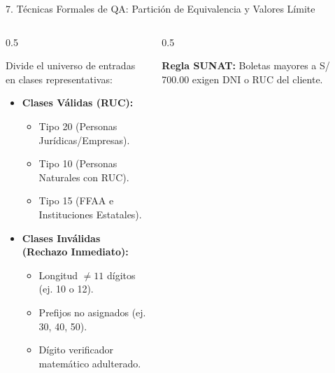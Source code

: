 \documentclass[aspectratio=169,10pt]{beamer}
\begin{document}
\begin{frame}{7. Técnicas Formales de QA: Partición de Equivalencia y Valores Límite}
\begin{columns}
\begin{column}{0.5\textwidth}
    \begin{tcolorbox}[colback=cardbg, colframe=cardbg, title=\color{accentblue}\bfseries 1. Partición de Equivalencia (EP)]
        Divide el universo de entradas en clases representativas:
        \begin{itemize}
            \item \textbf{Clases Válidas (RUC):}
            \begin{itemize}
                \item Tipo 20 (Personas Jurídicas/Empresas).
                \item Tipo 10 (Personas Naturales con RUC).
                \item Tipo 15 (FFAA e Instituciones Estatales).
            \end{itemize}
            \item \textbf{Clases Inválidas (Rechazo Inmediato):}
            \begin{itemize}
                \item Longitud $\neq 11$ dígitos (ej. 10 o 12).
                \item Prefijos no asignados (ej. 30, 40, 50).
                \item Dígito verificador matemático adulterado.
            \end{itemize}
        \end{itemize}
    \end{tcolorbox}
\end{column}
\begin{column}{0.5\textwidth}
    \begin{tcolorbox}[colback=cardbg, colframe=cardbg, title=\color{accentgreen}\bfseries 2. Análisis de Valores Límite (BVA)]
        \textbf{Regla SUNAT:} Boletas mayores a S/ 700.00 exigen DNI o RUC del cliente.
        \vspace{0.15cm}
        \begin{center}
\end{center}
\end{tcolorbox}
\end{column}
\end{columns}
\end{frame}
\end{document}

